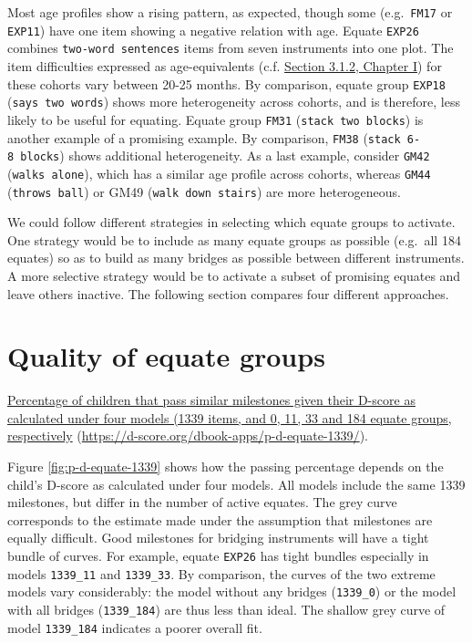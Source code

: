 \documentclass[
]{book}
\begin{document}
Most age profiles show a rising pattern, as expected, though some (e.g.~\texttt{FM17} or \texttt{EXP11}) have one item showing a negative relation with age. Equate \texttt{EXP26} combines \texttt{two-word\ sentences} items from seven instruments into one plot. The item difficulties expressed as age-equivalents (c.f. \href{https://d-score.org/dbook1/sec-agebased.html\#sec:ageequivalent}{Section 3.1.2, Chapter I}) for these cohorts vary between 20-25 months. By comparison, equate group \texttt{EXP18} (\texttt{says\ two\ words}) shows more heterogeneity across cohorts, and is therefore, less likely to be useful for equating. Equate group \texttt{FM31} (\texttt{stack\ two\ blocks}) is another example of a promising example. By comparison, \texttt{FM38} (\texttt{stack\ 6-8\ blocks}) shows additional heterogeneity. As a last example, consider \texttt{GM42} (\texttt{walks\ alone}), which has a similar age profile across cohorts, whereas \texttt{GM44} (\texttt{throws\ ball}) or GM49 (\texttt{walk\ down\ stairs}) are more heterogeneous.

We could follow different strategies in selecting which equate groups to activate. One strategy would be to include as many equate groups as possible (e.g.~all 184 equates) so as to build as many bridges as possible between different instruments. A more selective strategy would be to activate a subset of promising equates and leave others inactive. The following section compares four different approaches.

\hypertarget{sec:equatequality}{%
\section{Quality of equate groups}\label{sec:equatequality}}

\label{fig:p-d-equate-1339}\href{https://d-score.org/dbook-apps/p-d-equate-1339/\#display=Percent_pass_by_D_score__four_models\&nrow=2\&ncol=2\&arr=row\&pg=65\&labels=equate,model\&sort=equate_index;asc,model;asc\&filter=\&sidebar=\&fv=}{Percentage of children that pass similar milestones given their D-score as calculated under four models (1339 items, and 0, 11, 33 and 184 equate groups, respectively} (\url{https://d-score.org/dbook-apps/p-d-equate-1339/}).



Figure \ref{fig:p-d-equate-1339} shows how the passing percentage depends on the child's D-score as calculated under four models. All models include the same 1339 milestones, but differ in the number of active equates. The grey curve corresponds to the estimate made under the assumption that milestones are equally difficult. Good milestones for bridging instruments will have a tight bundle of curves. For example, equate \texttt{EXP26} has tight bundles especially in models \texttt{1339\_11} and \texttt{1339\_33}. By comparison, the curves of the two extreme models vary considerably: the model without any bridges (\texttt{1339\_0}) or the model with all bridges (\texttt{1339\_184}) are thus less than ideal. The shallow grey curve of model \texttt{1339\_184} indicates a poorer overall fit.
\end{document}
